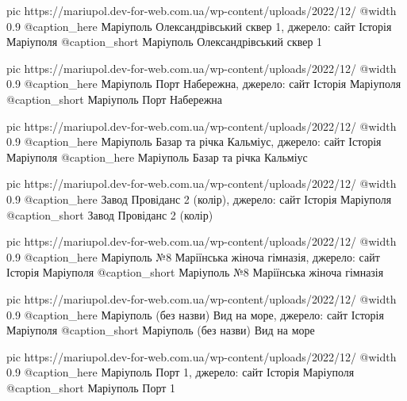 	pic https://mariupol.dev-for-web.com.ua/wp-content/uploads/2022/12/%
	@width 0.9
	@caption_here Маріуполь Олександрівський сквер 1, джерело: сайт Історія Маріуполя
	@caption_short Маріуполь Олександрівський сквер 1

	pic https://mariupol.dev-for-web.com.ua/wp-content/uploads/2022/12/%
	@width 0.9
	@caption_here Маріуполь Порт Набережна, джерело: сайт Історія Маріуполя
	@caption_short Маріуполь Порт Набережна

	pic https://mariupol.dev-for-web.com.ua/wp-content/uploads/2022/12/%
	@width 0.9
	@caption_here Маріуполь Базар та річка Кальміус, джерело: сайт Історія Маріуполя
	@caption_here Маріуполь Базар та річка Кальміус

	pic https://mariupol.dev-for-web.com.ua/wp-content/uploads/2022/12/%
	@width 0.9
	@caption_here Завод Провіданс 2 (колір), джерело: сайт Історія Маріуполя
	@caption_short Завод Провіданс 2 (колір)

	pic https://mariupol.dev-for-web.com.ua/wp-content/uploads/2022/12/%
	@width 0.9
	@caption_here Маріуполь №8 Маріїнська жіноча гімназія, джерело: сайт Історія Маріуполя
	@caption_short Маріуполь №8 Маріїнська жіноча гімназія

	pic https://mariupol.dev-for-web.com.ua/wp-content/uploads/2022/12/%
	@width 0.9
	@caption_here Маріуполь (без назви) Вид на море, джерело: сайт Історія Маріуполя
	@caption_short Маріуполь (без назви) Вид на море

	pic https://mariupol.dev-for-web.com.ua/wp-content/uploads/2022/12/%
	@width 0.9
	@caption_here Маріуполь Порт 1, джерело: сайт Історія Маріуполя
	@caption_short Маріуполь Порт 1

